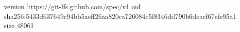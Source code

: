 version https://git-lfs.github.com/spec/v1
oid sha256:5433d637649c94bb5aeff26aa820ca726084c5f8346dd790b6deacf67efe95a1
size 48061
